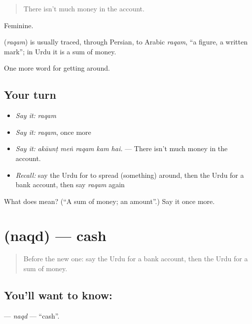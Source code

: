 \begin{quote}
There isn't much money in the account.
\end{quote}

Feminine.

\begin{cousinweb}
\textbf{} (\emph{raqam}) is usually traced, through Persian, to Arabic \emph{raqam}, \textquotedblleft{}a figure, a written mark\textquotedblright{}; in Urdu it is a sum of money.
\end{cousinweb}

\begin{grammarlens}[title={What you've built}]
One more word for getting around.
\end{grammarlens}

\subsection*{Your turn}
\begin{itemize}
\raggedright
  \item \emph{Say it:} \emph{raqam}
  \item \emph{Say it:} \emph{raqam}, once more
  \item \emph{Say it:} \emph{akāunṭ meṅ raqam kam hai.} — There isn't much money in the account.
  \item \emph{Recall:} say the Urdu for to spread (something) around, then the Urdu for a bank account, then say \emph{raqam} again
\end{itemize}

\begin{tcolorbox}[breakable,colback=teal!4,colframe=teal!35!black,title={Before you move on}]
What does  mean? (\textquotedblleft{}A sum of money; an amount\textquotedblright{}.) Say it once more.
\end{tcolorbox}
\section[\texorpdfstring{\ur{نقد} (naqd)}{نقد (naqd)}]{ (naqd) — cash}

\label{lesson:UR-C417-naqd}



\begin{quote}
Before the new one: say the Urdu for a bank account, then the Urdu for a sum of money.
\end{quote}

\subsection*{You'll want to know: }
\textbf{} — \emph{naqd} — \textquotedblleft{}cash\textquotedblright{}.

